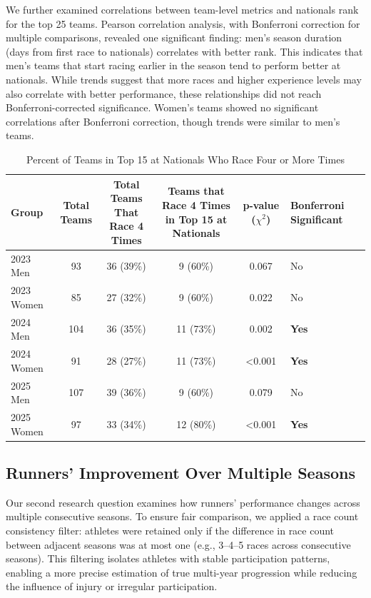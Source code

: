 \documentclass[suppldata]{interact}
\theoremstyle{plain}%
\theoremstyle{definition}
\theoremstyle{remark}
\begin{document}
We further examined correlations between team-level metrics and nationals rank for the top 25 teams. Pearson correlation analysis, with Bonferroni correction for multiple comparisons, revealed one significant finding: men's season duration (days from first race to nationals) correlates with better rank. This indicates that men's teams that start racing earlier in the season tend to perform better at nationals. While trends suggest that more races and higher experience levels may also correlate with better performance, these relationships did not reach Bonferroni-corrected significance. Women's teams showed no significant correlations after Bonferroni correction, though trends were similar to men's teams.
\begin{table}[ht!]
    \centering
    \begin{adjustbox}{max width=\linewidth}
    \begin{tabular}{|l|c|c|c|c|l|}
        \hline
        \textbf{Group} &
        \makecell{\textbf{Total} \\ \textbf{Teams}} &
        \makecell{\textbf{Total Teams That} \\ \textbf{Race 4 Times}} &
        \makecell{\textbf{Teams that Race 4 Times} \\ \textbf{in Top 15 at Nationals}} &
        \makecell{\textbf{p-value} \\ ($\chi^2$)}  & \textbf{Bonferroni Significant}\\ \hline
        2023 Men & 93& 36 (39\%)& 9 (60\%)& 0.067&No\\ \hline
        2023 Women & 85& 27 (32\%)& 9 (60\%) & 0.022&No\\ \hline
        2024 Men & 104& 36 (35\%)& 11 (73\%) & 0.002&\textbf{Yes}\\ \hline
        2024 Women & 91& 28 (27\%) & 11 (73\%) & \textless{}0.001&\textbf{Yes}\\\hline
 2025 Men& 107& 39 (36\%)& 9 (60\%)& 0.079&No\\\hline 
 2025 Women& 97& 33 (34\%)& 12 (80\%)& \textless{}0.001&\textbf{Yes}\\ \hline
    \end{tabular}
    \end{adjustbox}
    \caption{Percent of Teams in Top 15 at Nationals Who Race Four or More Times}
    \label{tab:per_nats}
\end{table}




\subsection{Runners' Improvement Over Multiple Seasons}
Our second research question examines how runners' performance changes across multiple consecutive seasons. To ensure fair comparison, we applied a race count consistency filter: athletes were retained only if the difference in race count between adjacent seasons was at most one (e.g., 3–4–5 races across consecutive seasons). This filtering isolates athletes with stable participation patterns, enabling a more precise estimation of true multi-year progression while reducing the influence of injury or irregular participation.
\end{document}
